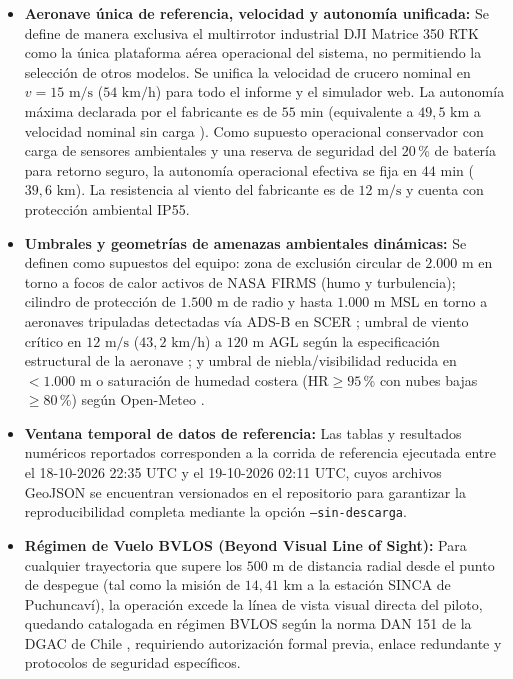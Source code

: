 \documentclass[letterpaper,12pt]{article}
\begin{document}
\begin{itemize}
    \item[\textbf{S6.}] \textbf{Aeronave única de referencia, velocidad y autonomía unificada:} Se define de manera exclusiva el multirrotor industrial DJI Matrice 350 RTK \cite{dji} como la única plataforma aérea operacional del sistema, no permitiendo la selección de otros modelos. Se unifica la velocidad de crucero nominal en $v = 15\text{ m/s}$ ($54\text{ km/h}$) para todo el informe y el simulador web. La autonomía máxima declarada por el fabricante es de $55\text{ min}$ (equivalente a $49{,}5\text{ km}$ a velocidad nominal sin carga \cite{dji}). Como supuesto operacional conservador con carga de sensores ambientales y una reserva de seguridad del $20$\,\% de batería para retorno seguro, la autonomía operacional efectiva se fija en $44\text{ min}$ ($39{,}6\text{ km}$). La resistencia al viento del fabricante es de $12\text{ m/s}$ y cuenta con protección ambiental IP55.
    \item[\textbf{S7.}] \textbf{Umbrales y geometrías de amenazas ambientales dinámicas:} Se definen como supuestos del equipo: zona de exclusión circular de $2.000\text{ m}$ en torno a focos de calor activos de NASA FIRMS \cite{schroeder} (humo y turbulencia); cilindro de protección de $1.500\text{ m}$ de radio y hasta $1.000\text{ m}$ MSL en torno a aeronaves tripuladas detectadas vía ADS-B en SCER \cite{opensky}; umbral de viento crítico en $12\text{ m/s}$ ($43{,}2\text{ km/h}$) a $120\text{ m}$ AGL según la especificación estructural de la aeronave \cite{dji}; y umbral de niebla/visibilidad reducida en $<1.000\text{ m}$ o saturación de humedad costera ($\text{HR} \ge 95$\,\% con nubes bajas $\ge 80$\,\%) según Open-Meteo \cite{openmeteo}.
    \item[\textbf{S8.}] \textbf{Ventana temporal de datos de referencia:} Las tablas y resultados numéricos reportados corresponden a la corrida de referencia ejecutada entre el 18-10-2026 22:35 UTC y el 19-10-2026 02:11 UTC, cuyos archivos GeoJSON se encuentran versionados en el repositorio para garantizar la reproducibilidad completa mediante la opción \texttt{--sin-descarga}.
    \item[\textbf{S9.}] \textbf{Régimen de Vuelo BVLOS (Beyond Visual Line of Sight):} Para cualquier trayectoria que supere los $500\text{ m}$ de distancia radial desde el punto de despegue (tal como la misión de $14{,}41\text{ km}$ a la estación SINCA de Puchuncaví), la operación excede la línea de vista visual directa del piloto, quedando catalogada en régimen BVLOS según la norma DAN 151 de la DGAC de Chile \cite{dan151}, requiriendo autorización formal previa, enlace redundante y protocolos de seguridad específicos.
\end{itemize}
\end{document}
